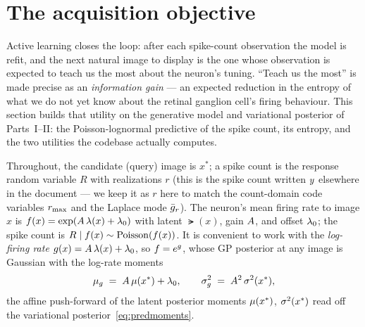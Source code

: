 
\section{The acquisition objective}\label{sec:utility}

Active learning closes the loop: after each spike-count observation the model is
refit, and the next natural image to display is the one whose observation is
expected to teach us the most about the neuron's tuning. ``Teach us the most'' is
made precise as an \emph{information gain} --- an expected reduction in the entropy
of what we do not yet know about the retinal ganglion cell's firing behaviour.
This section builds that utility on the generative model and variational posterior
of Parts~I--II: the Poisson-lognormal predictive of the spike count, its entropy,
and the two utilities the codebase actually computes.

Throughout, the candidate (query) image is $x^{*}$; a spike count is the response
random variable $R$ with realizations $r$ (this is the spike count written $y$
elsewhere in the document --- we keep it as $r$ here to match the count-domain
code variables $r_{\max}$ and the Laplace mode $\bar{g}_{r}$). The neuron's mean firing
rate to image $x$ is $f(x)=\exp(A\,\lambda(x)+\lambda_{0})$ with latent
$\lat(x)$, gain $A$, and offset $\lambda_{0}$; the spike count is
$R\mid f(x)\sim\mathrm{Poisson}(f(x))$. It is convenient to work with the
\emph{log-firing rate} $g(x)=A\,\lambda(x)+\lambda_{0}$, so $f=e^{g}$, whose
GP posterior at any image is Gaussian with the log-rate moments
%
\begin{equation}
  \mu_{g} \;=\; A\,\mu(x^{*})+\lambda_{0},
  \qquad
  \sigma_{g}^{2} \;=\; A^{2}\,\sigma^{2}(x^{*}),
  \label{eq:logratemoments}
\end{equation}
%
the affine push-forward of the latent posterior moments $\mu(x^{*})$,
$\sigma^{2}(x^{*})$ read off the variational posterior~\eqref{eq:predmoments}.

